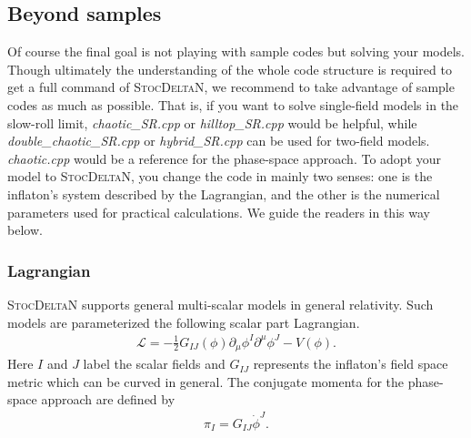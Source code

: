 \documentclass[aps, prd
, preprint
, nofootinbib 
, notitlepage
, superscriptaddress
, longbibliography
]{revtex4-1}
\newcommand{\dif}[2]{\frac{\mathrm{d} #1}{\mathrm{d} #2}}
\newcommand{\calL}{\mathcal{L}}
\newcommand{\bae}[1]{\begin{align} #1 \end{align}}
\newcommand{\YT}[1]{\textcolor{blue}{\sffamily [YT : #1]}}
\begin{document}
\subsection{Beyond samples}

Of course the final goal is not playing with sample codes but solving your models. Though ultimately the understanding of the whole code structure is required
to get a full command of \textsc{StocDeltaN}, we recommend to take advantage of sample codes as much as possible. That is, if you want to solve single-field models in the slow-roll limit,
\textit{chaotic\_SR.cpp} or \textit{hilltop\_SR.cpp} would be helpful, while \textit{double\_chaotic\_SR.cpp} or \textit{hybrid\_SR.cpp} can be used for two-field models. \textit{chaotic.cpp} would be a reference for the phase-space approach.
To adopt your model to \textsc{StocDeltaN}, you change the code in mainly two senses: one is the inflaton's system described by the Lagrangian, and the other is 
the numerical parameters used for practical calculations. We guide the readers in this way below.


\subsubsection{Lagrangian}

\textsc{StocDeltaN} supports general multi-scalar models in general relativity. Such models are parameterized the following scalar part Lagrangian.
\bae{\label{eq: Lagrangian}
	\calL=-\frac{1}{2}G_{IJ}(\phi)\partial_\mu\phi^I\partial^\mu\phi^J-V(\phi).
}
Here $I$ and $J$ label the scalar fields and $G_{IJ}$ represents the inflaton's field space metric which can be curved in general.
The conjugate momenta for the phase-space approach are defined by \YT{$G_{IJ}\dif{\phi^J}{N}$ is better?}
\bae{
    \pi_I=G_{IJ}\dot{\phi}^J. 
}
\end{document}
